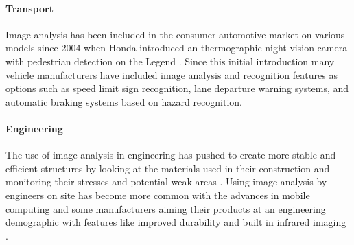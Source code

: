 	\paragraph{Transport}
	Image analysis has been included in the consumer automotive market on various models since 2004 when Honda introduced an thermographic night vision camera with pedestrian detection on the Legend  \citep{hondanightvision}. Since this initial introduction many vehicle manufacturers have included image analysis and recognition features as options such as speed limit sign recognition, lane departure warning systems, and automatic braking systems based on hazard recognition.
	\paragraph{Engineering}
	The use of image analysis in engineering has pushed to create more stable and efficient structures by looking at the materials used in their construction \citep{concreteanalysis} and monitoring their stresses and potential weak areas \citep{bridgecables}. Using image analysis by engineers on site has become more common with the advances in mobile computing and some manufacturers aiming their products at an engineering demographic with features like improved durability and built in infrared imaging \citep{catphone}.
